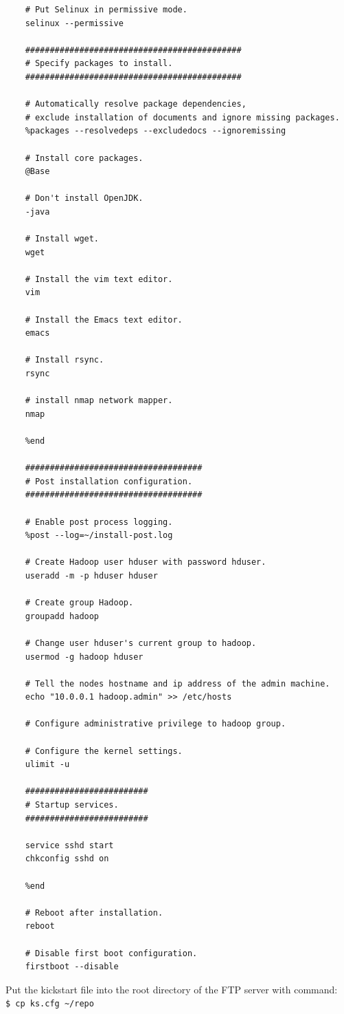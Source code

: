 \begin{verbatim}
    # Put Selinux in permissive mode.
    selinux --permissive

    ############################################
    # Specify packages to install.
    ############################################

    # Automatically resolve package dependencies,
    # exclude installation of documents and ignore missing packages.
    %packages --resolvedeps --excludedocs --ignoremissing

    # Install core packages.
    @Base

    # Don't install OpenJDK.
    -java

    # Install wget.
    wget

    # Install the vim text editor.
    vim

    # Install the Emacs text editor.
    emacs

    # Install rsync.
    rsync

    # install nmap network mapper.
    nmap

    %end

    ####################################
    # Post installation configuration.
    ####################################

    # Enable post process logging.
    %post --log=~/install-post.log

    # Create Hadoop user hduser with password hduser.
    useradd -m -p hduser hduser

    # Create group Hadoop.
    groupadd hadoop

    # Change user hduser's current group to hadoop.
    usermod -g hadoop hduser

    # Tell the nodes hostname and ip address of the admin machine.
    echo "10.0.0.1 hadoop.admin" >> /etc/hosts

    # Configure administrative privilege to hadoop group.

    # Configure the kernel settings.
    ulimit -u

    #########################
    # Startup services.
    #########################

    service sshd start
    chkconfig sshd on

    %end

    # Reboot after installation.
    reboot

    # Disable first boot configuration.
    firstboot --disable
\end{verbatim}

Put the kickstart file into the root directory of the FTP server with command: \\
\verb|$ cp ks.cfg ~/repo|


